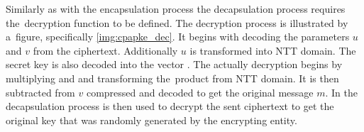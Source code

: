 Similarly as with the encapsulation process the decapsulation process requires the~decryption function to be defined. The decryption process is illustrated by a~figure, specifically \ref{img:cpapke_dec}. It begins with decoding the parameters $u$ and $v$ from the ciphertext. Additionally $u$ is transformed into NTT domain. The secret key is also decoded into the vector . The actually decryption begins by multiplying  and  and transforming the~product from NTT domain. It is then subtracted from $v$ compressed and decoded to get the original message $m$. In the decapsulation process is then used to decrypt the sent ciphertext to get the original key that was randomly generated by the encrypting entity.


